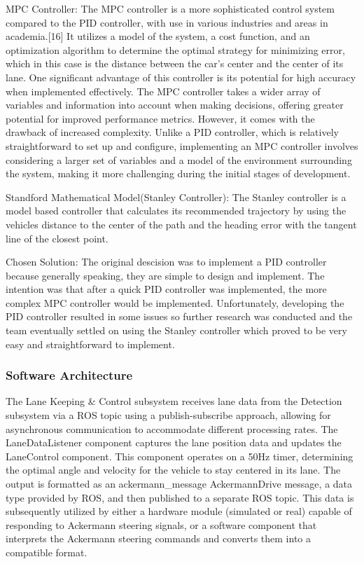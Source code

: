 \documentclass[titlepage]{article}
\begin{document}
MPC Controller:
The MPC controller is a more sophisticated control system compared to the PID controller, with use in various industries and areas in academia.[16] It utilizes a model of the system, a cost function, and an optimization algorithm to determine the optimal strategy for minimizing error, which in this case is the distance between the car’s center and the center of its lane. One significant advantage of this controller is its potential for high accuracy when implemented effectively. The MPC controller takes a wider array of variables and information into account when making decisions, offering greater potential for improved performance metrics. However, it comes with the drawback of increased complexity. Unlike a PID controller, which is relatively straightforward to set up and configure, implementing an MPC controller involves considering a larger set of variables and a model of the environment surrounding the system, making it more challenging during the initial stages of development. 

Standford Mathematical Model(Stanley Controller):
The Stanley controller is a model based controller that calculates its recommended trajectory by using the vehicles distance to the center of the path and the heading error with the tangent line of the closest point.

Chosen Solution:
The original descision was to implement a PID controller because generally speaking, they are simple to design and implement. The intention was that after a quick PID controller was implemented, the more complex MPC controller would be implemented. Unfortunately, developing the PID controller resulted in some issues so further research was conducted and the team eventually settled on using the Stanley controller which proved to be very easy and straightforward to implement. 

\subsubsection{Software Architecture}
The Lane Keeping \& Control subsystem receives lane data from the Detection subsystem via a ROS topic using a publish-subscribe approach, allowing for asynchronous communication to accommodate different processing rates. The LaneDataListener component captures the lane position data and updates the LaneControl component. This component operates on a 50Hz timer, determining the optimal angle and velocity for the vehicle to stay centered in its lane. The output is formatted as an 
ackermann\_message
\/
AckermannDrive message, 
a data type provided by ROS, and then published to a separate ROS topic. This data is subsequently utilized by either a hardware module (simulated or real) capable of responding to Ackermann steering signals, or a software component that interprets the Ackermann steering commands and converts them into a compatible format.
\end{document}
